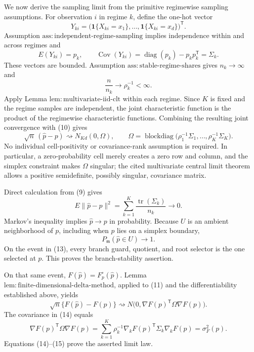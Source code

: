 We now derive the sampling limit from the primitive regimewise sampling assumptions.  For observation \(i\) in regime \(k\), define the one-hot vector
\[
 Y_{ki}=\bigl(\mathbf 1\{X_{ki}=x_1\},\ldots,
                    \mathbf 1\{X_{ki}=x_d\}\bigr)^{\mathsf T}.
\]
Assumption \(\mathrm{ass:independent\text{-}regime\text{-}sampling}\) implies independence within and across regimes and
\[
 E(Y_{ki})=p_k,
 \qquad
 \operatorname{Cov}(Y_{ki})
 =\operatorname{diag}(p_k)-p_kp_k^{\mathsf T}
 =\Sigma_k. \tag{9}
\]
These vectors are bounded.  Assumption \(\mathrm{ass:stable\text{-}regime\text{-}shares}\) gives \(n_k\to\infty\) and
\[
 \frac{n}{n_k}\longrightarrow\rho_k^{-1}<\infty. \tag{10}
\]
Apply Lemma \(\mathrm{lem:multivariate\text{-}iid\text{-}clt}\) within each regime.  Since \(K\) is fixed and the regime samples are independent, the joint characteristic function is the product of the regimewise characteristic functions.  Combining the resulting joint convergence with (10) gives
\[
 \sqrt n\,(\widehat p-p)
 \rightsquigarrow
 N_{Kd}(0,\Omega),
 \qquad
 \Omega=\operatorname{blockdiag}
 \bigl(\rho_1^{-1}\Sigma_1,\ldots,
       \rho_K^{-1}\Sigma_K\bigr). \tag{11}
\]
No individual cell-positivity or covariance-rank assumption is required.  In particular, a zero-probability cell merely creates a zero row and column, and the simplex constraint makes \(\Omega\) singular; the cited multivariate central limit theorem allows a positive semidefinite, possibly singular, covariance matrix.

Direct calculation from (9) gives
\[
 E\lVert\widehat p-p\rVert^2
 =\sum_{k=1}^{K}\frac{\operatorname{tr}(\Sigma_k)}{n_k}
 \longrightarrow0. \tag{12}
\]
Markov's inequality implies \(\widehat p\to p\) in probability.  Because \(U\) is an ambient neighborhood of \(p\), including when \(p\) lies on a simplex boundary,
\[
 P_{\mathfrak m}(\widehat p\in U)\longrightarrow1. \tag{13}
\]
On the event in (13), every branch guard, quotient, and root selector is the one selected at \(p\).  This proves the branch-stability assertion.

On that same event, \(F(\widehat p)=F_p^{\circ}(\widehat p)\).  Lemma \(\mathrm{lem:finite\text{-}dimensional\text{-}delta\text{-}method}\), applied to (11) and the differentiability established above, yields
\[
 \sqrt n\{F(\widehat p)-F(p)\}
 \rightsquigarrow N\bigl(0,\nabla F(p)^{\mathsf T}\Omega\nabla F(p)\bigr). \tag{14}
\]
The covariance in (14) equals
\[
 \nabla F(p)^{\mathsf T}\Omega\nabla F(p)
 =\sum_{k=1}^{K}\rho_k^{-1}
   \nabla_kF(p)^{\mathsf T}\Sigma_k\nabla_kF(p)
 =\sigma_F^2(p). \tag{15}
\]
Equations (14)--(15) prove the asserted limit law.

